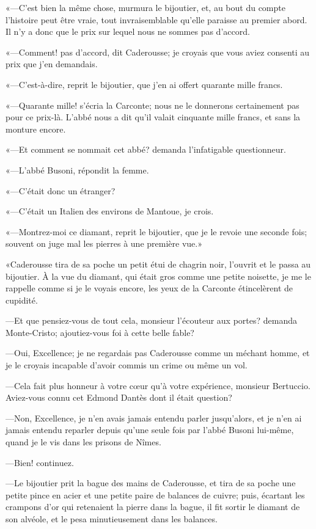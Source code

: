 «—C'est bien la même chose, murmura le bijoutier, et, au bout du compte l'histoire peut être vraie, tout invraisemblable qu'elle paraisse au premier abord. Il n'y a donc que le prix sur lequel nous ne sommes pas d'accord. 

«—Comment! pas d'accord, dit Caderousse; je croyais que vous aviez consenti au prix que j'en demandais. 

«—C'est-à-dire, reprit le bijoutier, que j'en ai offert quarante mille francs. 

«—Quarante mille! s'écria la Carconte; nous ne le donnerons certainement pas pour ce prix-là. L'abbé nous a dit qu'il valait cinquante mille francs, et sans la monture encore. 

«—Et comment se nommait cet abbé? demanda l'infatigable questionneur. 

«—L'abbé Busoni, répondit la femme.  

«—C'était donc un étranger? 

«—C'était un Italien des environs de Mantoue, je crois. 

«—Montrez-moi ce diamant, reprit le bijoutier, que je le revoie une seconde fois; souvent on juge mal les pierres à une première vue.» 

«Caderousse tira de sa poche un petit étui de chagrin noir, l'ouvrit et le passa au bijoutier. À la vue du diamant, qui était gros comme une petite noisette, je me le rappelle comme si je le voyais encore, les yeux de la Carconte étincelèrent de cupidité. 

—Et que pensiez-vous de tout cela, monsieur l'écouteur aux portes? demanda Monte-Cristo; ajoutiez-vous foi à cette belle fable? 

—Oui, Excellence; je ne regardais pas Caderousse comme un méchant homme, et je le croyais incapable d'avoir commis un crime ou même un vol. 

—Cela fait plus honneur à votre cœur qu'à votre expérience, monsieur Bertuccio. Aviez-vous connu cet Edmond Dantès dont il était question? 

—Non, Excellence, je n'en avais jamais entendu parler jusqu'alors, et je n'en ai jamais entendu reparler depuis qu'une seule fois par l'abbé Busoni lui-même, quand je le vis dans les prisons de Nîmes.  

—Bien! continuez. 

—Le bijoutier prit la bague des mains de Caderousse, et tira de sa poche une petite pince en acier et une petite paire de balances de cuivre; puis, écartant les crampons d'or qui retenaient la pierre dans la bague, il fit sortir le diamant de son alvéole, et le pesa minutieusement dans les balances. 

